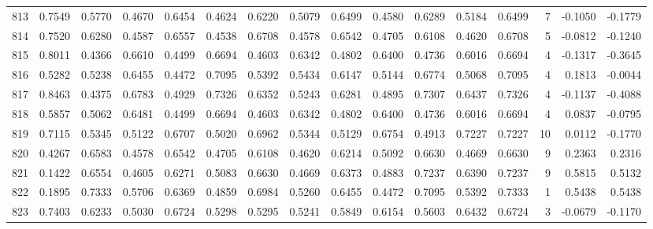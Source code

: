 \begin{tabular}{lrrrrrrrrrrrrrrr}
813 &      0.7549 &  0.5770 &  0.4670 &  0.6454 &  0.4624 &  0.6220 &  0.5079 &  0.6499 &  0.4580 &  0.6289 &   0.5184 &     0.6499 &      7 &                   -0.1050 &                    -0.1779 \\
814 &      0.7520 &  0.6280 &  0.4587 &  0.6557 &  0.4538 &  0.6708 &  0.4578 &  0.6542 &  0.4705 &  0.6108 &   0.4620 &     0.6708 &      5 &                   -0.0812 &                    -0.1240 \\
815 &      0.8011 &  0.4366 &  0.6610 &  0.4499 &  0.6694 &  0.4603 &  0.6342 &  0.4802 &  0.6400 &  0.4736 &   0.6016 &     0.6694 &      4 &                   -0.1317 &                    -0.3645 \\
816 &      0.5282 &  0.5238 &  0.6455 &  0.4472 &  0.7095 &  0.5392 &  0.5434 &  0.6147 &  0.5144 &  0.6774 &   0.5068 &     0.7095 &      4 &                    0.1813 &                    -0.0044 \\
817 &      0.8463 &  0.4375 &  0.6783 &  0.4929 &  0.7326 &  0.6352 &  0.5243 &  0.6281 &  0.4895 &  0.7307 &   0.6437 &     0.7326 &      4 &                   -0.1137 &                    -0.4088 \\
818 &      0.5857 &  0.5062 &  0.6481 &  0.4499 &  0.6694 &  0.4603 &  0.6342 &  0.4802 &  0.6400 &  0.4736 &   0.6016 &     0.6694 &      4 &                    0.0837 &                    -0.0795 \\
819 &      0.7115 &  0.5345 &  0.5122 &  0.6707 &  0.5020 &  0.6962 &  0.5344 &  0.5129 &  0.6754 &  0.4913 &   0.7227 &     0.7227 &     10 &                    0.0112 &                    -0.1770 \\
820 &      0.4267 &  0.6583 &  0.4578 &  0.6542 &  0.4705 &  0.6108 &  0.4620 &  0.6214 &  0.5092 &  0.6630 &   0.4669 &     0.6630 &      9 &                    0.2363 &                     0.2316 \\
821 &      0.1422 &  0.6554 &  0.4605 &  0.6271 &  0.5083 &  0.6630 &  0.4669 &  0.6373 &  0.4883 &  0.7237 &   0.6390 &     0.7237 &      9 &                    0.5815 &                     0.5132 \\
822 &      0.1895 &  0.7333 &  0.5706 &  0.6369 &  0.4859 &  0.6984 &  0.5260 &  0.6455 &  0.4472 &  0.7095 &   0.5392 &     0.7333 &      1 &                    0.5438 &                     0.5438 \\
823 &      0.7403 &  0.6233 &  0.5030 &  0.6724 &  0.5298 &  0.5295 &  0.5241 &  0.5849 &  0.6154 &  0.5603 &   0.6432 &     0.6724 &      3 &                   -0.0679 &                    -0.1170 \\

\end{tabular}

